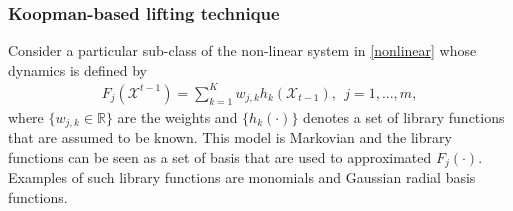 \subsubsection{Koopman-based lifting technique}
Consider a particular sub-class of the non-linear system in \eqref{nonlinear} whose dynamics is defined by
\begin{align}\label{nonlin}
F_{j}(\mathcal{X}^{t-1}) = \sum_{k=1}^K w_{j,k} h_k(\mathcal{X}_{t-1}), \ \ j=1,...,m,
\end{align}
where $\{w_{j,k}\in\mathbb{R}\}$ are the weights and $\{h_k(\cdot)\}$ denotes a set of library functions that are assumed to be known.
This model is Markovian and the library functions can be seen as a set of basis that are used to approximated $F_j(\cdot)$.
Examples of such library functions are monomials and Gaussian radial basis functions. 



